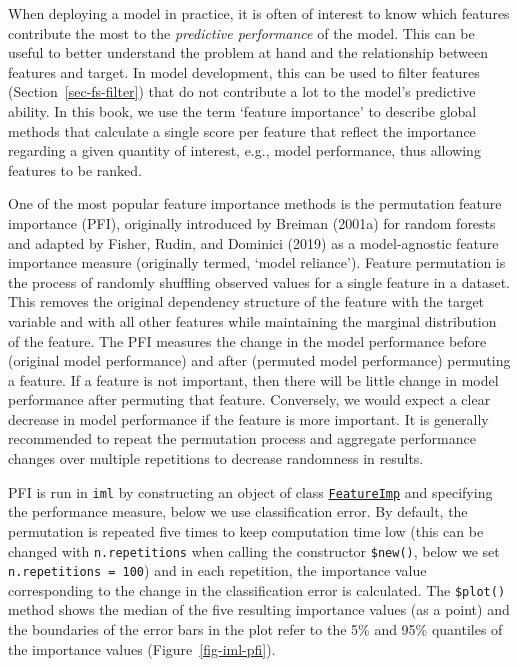 When deploying a model in practice, it is often of interest to know
which features contribute the most to the \emph{predictive performance}
of the model. This can be useful to better understand the problem at
hand and the relationship between features and target. In model
development, this can be used to filter features
(Section~\ref{sec-fs-filter}) that do not contribute a lot to the
model's predictive ability. In this book, we use the term `feature
importance' to describe global methods that calculate a single score per
feature that reflect the importance regarding a given quantity of
interest, e.g., model performance, thus allowing features to be ranked.

One of the most popular feature importance methods is the permutation
feature
importance (PFI), originally introduced by
Breiman (2001a) for random forests and adapted by
Fisher, Rudin, and Dominici (2019) as a model-agnostic feature
importance measure (originally termed, `model reliance'). Feature
permutation is the process of randomly shuffling observed values for a
single feature in a dataset. This removes the original dependency
structure of the feature with the target variable and with all other
features while maintaining the marginal distribution of the feature. The
PFI measures the change in the model performance before (original model
performance) and after (permuted model performance) permuting a feature.
If a feature is not important, then there will be little change in model
performance after permuting that feature. Conversely, we would expect a
clear decrease in model performance if the feature is more important. It
is generally recommended to repeat the permutation process and aggregate
performance changes over multiple repetitions to decrease randomness in
results.

PFI is run in \texttt{iml} by constructing an object of class
\href{https://www.rdocumentation.org/packages/iml/topics/FeatureImp}{\texttt{FeatureImp}}
and specifying the performance measure, below we use classification
error. By default, the permutation is repeated five times to keep
computation time low (this can be changed with \texttt{n.repetitions}
when calling the constructor \texttt{\$new()}, below we set
\texttt{n.repetitions\ =\ 100}) and in each repetition, the importance
value corresponding to the change in the classification error is
calculated. The \texttt{\$plot()} method shows the median of the five
resulting importance values (as a point) and the boundaries of the error
bars in the plot refer to the 5\% and 95\% quantiles of the importance
values (Figure~\ref{fig-iml-pfi}).

